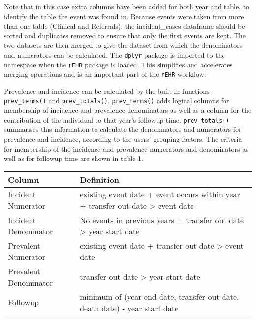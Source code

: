 \documentclass[]{article}
\newenvironment{Shaded}{\begin{snugshade}}{\end{snugshade}}
\newcommand{\KeywordTok}[1]{\textcolor[rgb]{0.13,0.29,0.53}{\textbf{{#1}}}}
\newcommand{\StringTok}[1]{\textcolor[rgb]{0.31,0.60,0.02}{{#1}}}
\newcommand{\NormalTok}[1]{{#1}}
\begin{document}
Note that in this case extra columns have been added for both year and
table, to identify the table the event was found in. Because events were
taken from more than one table (Clinical and Referrals), the
incident\_cases dataframe should be sorted and duplicates removed to
ensure that only the first events are kept. The two datasets are then
merged to give the dataset from which the denominators and numerators
can be calculated. The \texttt{dplyr} package is imported to the
namespace when the \texttt{rEHR} package is loaded. This simplifies and
accelerates merging operations and is an important part of the
\texttt{rEHR} workflow:

\begin{Shaded}
\end{Shaded}

Prevalence and incidence can be calculated by the built-in functions
\texttt{prev\_terms()} and \texttt{prev\_totals()}.
\texttt{prev\_terms()} adds logical columns for membership of incidence
and prevalence denominators as well as a column for the contribution of
the individual to that year's followup time. \texttt{prev\_totals()}
summarises this information to calculate the denominators and numerators
for prevalence and incidence, according to the users' grouping factors.
The criteria for membership of the incidence and prevalence numerators
and denominators as well as for followup time are shown in table 1.

\begin{longtable}[c]{@{}ll@{}}
\toprule
Column & Definition\tabularnewline
\midrule
\endhead
Incident Numerator & existing event date + event occurs within year +
transfer out date \textgreater{} event date\tabularnewline
Incident Denominator & No events in previous years + transfer out date
\textgreater{} year start date\tabularnewline
Prevalent Numerator & existing event date + transfer out date
\textgreater{} event date\tabularnewline
Prevalent Denominator & transfer out date \textgreater{} year start
date\tabularnewline
Followup & minimum of (year end date, transfer out date, death date) -
year start date\tabularnewline
\bottomrule
\end{longtable}
\end{document}
